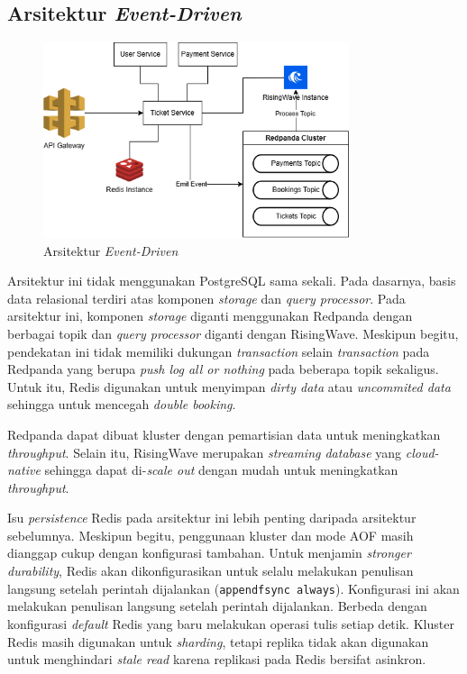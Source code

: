 \subsection{Arsitektur \textit{Event-Driven}}

\begin{figure}[htbp]
    \centering
    \includegraphics[width=0.8\textwidth]{resources/appendix/architecture-event-driven.png}
    \caption{Arsitektur \textit{Event-Driven}}
    \label{fig:solution-event-driven-architecture}
\end{figure}

Arsitektur ini tidak menggunakan PostgreSQL sama sekali. Pada dasarnya, basis data relasional terdiri atas komponen \textit{storage} dan \textit{query processor}. Pada arsitektur ini, komponen \textit{storage} diganti menggunakan Redpanda dengan berbagai topik dan \textit{query processor} diganti dengan RisingWave. Meskipun begitu, pendekatan ini tidak memiliki dukungan \textit{transaction} selain \textit{transaction} pada Redpanda yang berupa \textit{push log all or nothing} pada beberapa topik sekaligus. Untuk itu, Redis digunakan untuk menyimpan \textit{dirty data} atau \textit{uncommited data} sehingga untuk mencegah \textit{double booking}.

Redpanda dapat dibuat kluster dengan pemartisian data untuk meningkatkan \textit{throughput}. Selain itu, RisingWave merupakan \textit{streaming database} yang \textit{cloud-native} sehingga dapat di-\textit{scale out} dengan mudah untuk meningkatkan \textit{throughput}.

Isu \textit{persistence} Redis pada arsitektur ini lebih penting daripada arsitektur sebelumnya. Meskipun begitu, penggunaan kluster dan mode AOF masih dianggap cukup dengan konfigurasi tambahan. Untuk menjamin \textit{stronger durability}, Redis akan dikonfigurasikan untuk selalu melakukan penulisan langsung setelah perintah dijalankan (\texttt{appendfsync always}). Konfigurasi ini akan melakukan penulisan langsung setelah perintah dijalankan. Berbeda dengan konfigurasi \textit{default} Redis yang baru melakukan operasi tulis setiap detik. Kluster Redis masih digunakan untuk \textit{sharding}, tetapi replika tidak akan digunakan untuk menghindari \textit{stale read} karena replikasi pada Redis bersifat asinkron.

